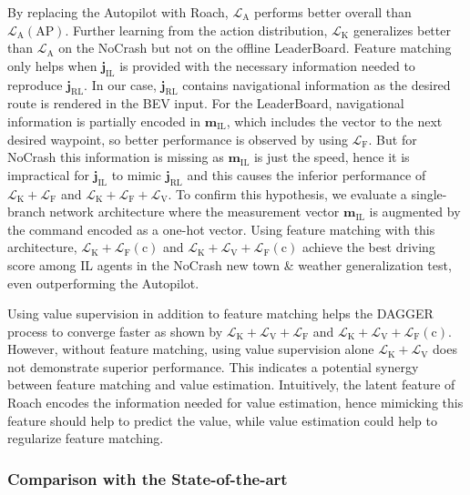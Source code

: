 By replacing the Autopilot with Roach, $\mathcal{L}_\text{A}$ performs better overall than $\mathcal{L}_\text{A}(\text{AP})$.
Further learning from the action distribution, $\mathcal{L}_\text{K}$ generalizes better than $\mathcal{L}_\text{A}$ on the NoCrash but not on the offline LeaderBoard.
Feature matching only helps when $\mathbf{j}_\text{IL}$ is provided with the necessary information needed to reproduce $\mathbf{j}_\text{RL}$.
In our case, $\mathbf{j}_\text{RL}$ contains navigational information as the desired route is rendered in the BEV input.
For the LeaderBoard, navigational information is partially encoded in $\mathbf{m}_\text{IL}$, which includes the vector to the next desired waypoint, so better performance is observed by using $\mathcal{L}_\text{F}$.
But for NoCrash this information is missing as $\mathbf{m}_\text{IL}$ is just the speed, hence it is impractical for $\mathbf{j}_\text{IL}$ to mimic $\mathbf{j}_\text{RL}$ and this causes the inferior performance of $\mathcal{L}_\text{K}+\mathcal{L}_\text{F}$ and $\mathcal{L}_\text{K}+\mathcal{L}_\text{F}+\mathcal{L}_\text{V}$.
To confirm this hypothesis, we evaluate a single-branch network architecture where the measurement vector $\mathbf{m}_\text{IL}$ is augmented by the command encoded as a one-hot vector.
Using feature matching with this architecture, $\mathcal{L}_\text{K}+\mathcal{L}_\text{F}(\text{c})$ and $\mathcal{L}_\text{K}+\mathcal{L}_\text{V}+\mathcal{L}_\text{F}(\text{c})$ achieve the best driving score among IL agents in the NoCrash new town \& weather generalization test, even outperforming the Autopilot.


Using value supervision in addition to feature matching helps the DAGGER process to converge faster as shown by $\mathcal{L}_\text{K}+\mathcal{L}_\text{V}+\mathcal{L}_\text{F}$ and $\mathcal{L}_\text{K}+\mathcal{L}_\text{V}+\mathcal{L}_\text{F}(\text{c})$.
However, without feature matching, using value supervision alone $\mathcal{L}_\text{K}+\mathcal{L}_\text{V}$ does not demonstrate superior performance.
This indicates a potential synergy between feature matching and value estimation.
Intuitively, the latent feature of Roach encodes the information needed for value estimation, hence mimicking this feature should help to predict the value,
while value estimation could help to regularize feature matching.


\subsubsection{Comparison with the State-of-the-art}

